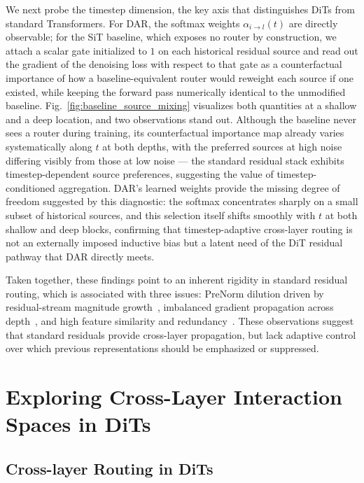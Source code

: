 \documentclass{llmxive}
\begin{document}
We next probe the timestep dimension, the key axis that distinguishes DiTs from standard Transformers. For \textsc{DAR}, the softmax weights $\alpha_{i\to l}(t)$ are directly observable; for the SiT baseline, which exposes no router by construction, we attach a scalar gate initialized to $1$ on each historical residual source and read out the gradient of the denoising loss with respect to that gate as a counterfactual importance of how a baseline-equivalent router would reweight each source if one existed, while keeping the forward pass numerically identical to the unmodified baseline. Fig.~\ref{fig:baseline_source_mixing} visualizes both quantities at a shallow and a deep location, and two observations stand out. Although the baseline never sees a router during training, its counterfactual importance map already varies systematically along $t$ at both depths, with the preferred sources at high noise differing visibly from those at low noise --- the standard residual stack exhibits timestep-dependent source preferences, suggesting the value of timestep-conditioned aggregation. \textsc{DAR}'s learned weights provide the missing degree of freedom suggested by this diagnostic: the softmax concentrates sharply on a small subset of historical sources, and this selection itself shifts smoothly with $t$ at both shallow and deep blocks, confirming that timestep-adaptive cross-layer routing is not an externally imposed inductive bias but a latent need of the DiT residual pathway that \textsc{DAR} directly meets.

Taken together, these findings point to an inherent rigidity in standard residual routing, which is associated with three issues: PreNorm dilution driven by residual-stream magnitude growth~\citep{nguyen2019transformers,xiong2020layer,li2026siamesenorm,team2026attention}, imbalanced gradient propagation across depth~\citep{team2026attention,xie2025mhc,zhu2024hyper}, and high feature similarity and redundancy~\citep{jiang2024tracing,song2024sleb,men2025shortgpt,chen2026sortblock}. These observations suggest that standard residuals provide cross-layer propagation, but lack adaptive control over which previous representations should be emphasized or suppressed.


\section{Exploring Cross-Layer Interaction Spaces in DiTs}   \label{sec:dar}

\subsection{Cross-layer Routing in DiTs}
\end{document}
